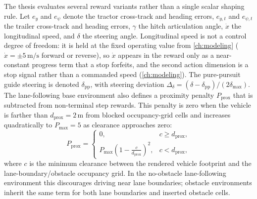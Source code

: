 The thesis evaluates several reward variants rather than a single scalar shaping rule. Let
$e_y$ and $e_\psi$ denote the tractor cross-track and heading errors, $e_{y,t}$ and
$e_{\psi,t}$ the trailer cross-track and heading errors, $\gamma$ the hitch articulation
angle, $\dot{x}$ the longitudinal speed, and $\delta$ the steering angle. Longitudinal
speed is not a control degree of freedom: it is held at the fixed operating value from
\cref{ch:modeling} ($\dot{x}=\pm 5\,\mathrm{m/s}$ forward or reverse), so $\dot{x}$ appears
in the reward only as a near-constant progress term that a stop forfeits, and the second
action dimension is a stop signal rather than a commanded speed (\cref{ch:modeling}). The
pure-pursuit guide steering is denoted $\delta_{\mathrm{pp}}$, with steering deviation
$\Delta_\delta = (\delta - \delta_{\mathrm{pp}})/(2\delta_{\max})$.
The lane-following base environment also defines a proximity penalty
$P_{\mathrm{prox}}$ that is subtracted from non-terminal step rewards. This
penalty is zero when the vehicle is farther than $d_{\mathrm{prox}}=2\,\mathrm{m}$
from blocked occupancy-grid cells and increases quadratically to
$P_{\max}=5$ as clearance approaches zero:
\begin{equation}
P_{\mathrm{prox}} =
\begin{cases}
0, & c \ge d_{\mathrm{prox}},\\
P_{\max}\left(1-\frac{c}{d_{\mathrm{prox}}}\right)^2, & c < d_{\mathrm{prox}},
\end{cases}
\end{equation}
where $c$ is the minimum clearance between the rendered vehicle footprint and
the lane-boundary/obstacle occupancy grid. In the no-obstacle lane-following
environment this discourages driving near lane boundaries; obstacle environments
inherit the same term for both lane boundaries and inserted obstacle cells.

